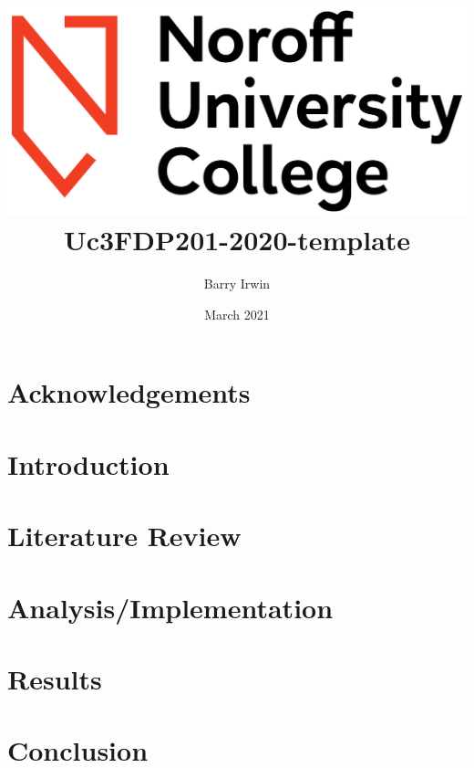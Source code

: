 \documentclass{nucthesis}
\title{%
   \includegraphics[width=.5\textwidth]{images/NoroffUClogoH.jpg} 
   \vspace{5cm}
  \\Uc3FDP201-2020-template}
\author{Barry Irwin}
\date{March 2021}
\begin{document}
\maketitle
\thispagestyle{empty} 


\begin{abstract}
    \lipsum
\end{abstract}
\chapter*{Acknowledgements}
\lipsum
\tableofcontents{}
\linespread{1.1}
\chapter{Introduction}

\chapter{Literature Review}
\lipsum
\chapter{Analysis/Implementation}
\lipsum
\chapter{Results}
\lipsum
\chapter{Conclusion}
\lipsum

\end{document}
